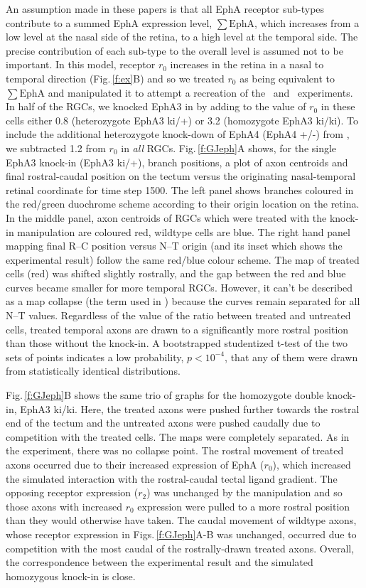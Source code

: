 \documentclass[9pt,lineno,draft]{elife}
\begin{document}
An assumption made in these papers is that all EphA receptor sub-types contribute to a summed EphA expression level, $\sum\mathrm{EphA}$, which increases from a low level at the nasal side of the retina, to a high level at the temporal side.
The precise contribution of each sub-type to the overall level is assumed not to be important.
In this model, receptor $r_0$ increases in the retina in a nasal to temporal direction (Fig.\,\ref{f:ex}B) and so we treated $r_0$ as being equivalent to $\sum\mathrm{EphA}$ and manipulated it to attempt a recreation of the \citet{brown_topographic_2000}~and \citet{reber_relative_2004}~experiments.
In half of the RGCs, we knocked EphA3 in by adding to the value of $r_0$ in these cells either 0.8 (heterozygote EphA3 ki/+) or 3.2 (homozygote EphA3 ki/ki).
To include the additional heterozygote knock-down of EphA4 (EphA4 +/-) from \citet{reber_relative_2004}, we subtracted 1.2 from $r_0$ in \emph{all} RGCs.
Fig.\,\ref{f:GJeph}A shows, for the single EphA3 knock-in (EphA3 ki/+), branch positions, a plot of axon centroids and final rostral-caudal position on the tectum versus the originating nasal-temporal retinal coordinate for time step 1500.
The left panel shows branches coloured in the red/green duochrome scheme according to their origin location on the retina.
In the middle panel, axon centroids of RGCs which were treated with the knock-in manipulation are coloured red, wildtype cells are blue.
The right hand panel mapping final R--C position versus N--T origin  (and its inset which shows the experimental result) follow the same red/blue colour scheme.
The map of treated cells (red) was shifted slightly rostrally, and the gap between the red and blue curves became smaller for more temporal RGCs. However, it can't be described as a map collapse (the term used in \citet{brown_topographic_2000}) because the curves remain separated for all N--T values. Regardless of the value of the ratio between treated and untreated cells, treated temporal axons are drawn to a significantly more rostral position than those without the knock-in. A bootstrapped studentized t-test of the two sets of points indicates a low probability, $p<10^{-4}$, that any of them were drawn from statistically identical distributions.

Fig.\,\ref{f:GJeph}B shows the same trio of graphs for the homozygote double knock-in, EphA3 ki/ki. Here, the treated axons were pushed further towards the rostral end of the tectum and the untreated axons were pushed caudally due to competition with the treated cells.
The maps were completely separated. As in the experiment, there was no collapse point.
The rostral movement of treated axons occurred due to their increased expression of EphA ($r_0$), which increased the simulated interaction with the rostral-caudal tectal ligand gradient.
The opposing receptor expression ($r_2$) was unchanged by the manipulation and so those axons with increased $r_0$ expression were pulled to a more rostral position than they would otherwise have taken.
The caudal movement of wildtype axons, whose receptor expression in Figs.\,\ref{f:GJeph}A-B was unchanged, occurred due to competition with the most caudal of the rostrally-drawn treated axons.
Overall, the correspondence between the experimental result and the simulated homozygous knock-in is close.
\end{document}
